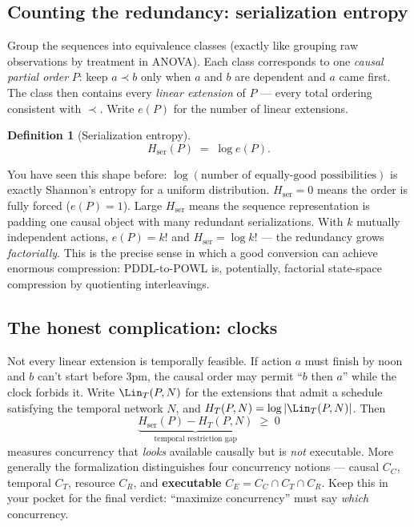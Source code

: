 \documentclass[11pt]{article}
\theoremstyle{definition}
\newtheorem{definition}{Definition}[section]
\theoremstyle{plain}
\theoremstyle{remark}
\begin{document}
\subsection{Counting the redundancy: serialization entropy}

Group the sequences into equivalence classes (exactly like grouping raw
observations by treatment in ANOVA). Each class corresponds to one
\emph{causal partial order} $P$: keep $a \prec b$ only when $a$ and $b$
are dependent and $a$ came first. The class then contains every
\emph{linear extension} of $P$ --- every total ordering consistent with
$\prec$. Write $e(P)$ for the number of linear extensions.

\begin{definition}[Serialization entropy]
\[
  H_{\mathrm{ser}}(P) \;=\; \log e(P).
\]
\end{definition}

You have seen this shape before: $\log(\text{number of equally-good
possibilities})$ is exactly Shannon's entropy for a uniform distribution.
$H_{\mathrm{ser}} = 0$ means the order is fully forced ($e(P) = 1$). Large
$H_{\mathrm{ser}}$ means the sequence representation is padding one causal
object with many redundant serializations. With $k$ mutually independent
actions, $e(P) = k!$ and $H_{\mathrm{ser}} = \log k!$ --- the redundancy
grows \emph{factorially}. This is the precise sense in which a good
conversion can achieve enormous compression: PDDL-to-POWL is, potentially,
factorial state-space compression by quotienting interleavings.

\subsection{The honest complication: clocks}

Not every linear extension is temporally feasible. If action $a$ must finish
by noon and $b$ can't start before 3pm, the causal order may permit
``$b$ then $a$'' while the clock forbids it. Write
$\Lin_T(P, N)$ for the extensions that admit a schedule satisfying the
temporal network $N$, and $H_T(P, N) = \log|\Lin_T(P, N)|$. Then
\[
  \underbrace{H_{\mathrm{ser}}(P) - H_T(P, N)}_{\text{temporal restriction gap}} \;\ge\; 0
\]
measures concurrency that \emph{looks} available causally but is
\emph{not} executable. More generally the formalization distinguishes four
concurrency notions --- causal $C_C$, temporal $C_T$, resource $C_R$, and
\textbf{executable} $C_E = C_C \cap C_T \cap C_R$. Keep this in your
pocket for the final verdict: ``maximize concurrency'' must say
\emph{which} concurrency.
\end{document}
